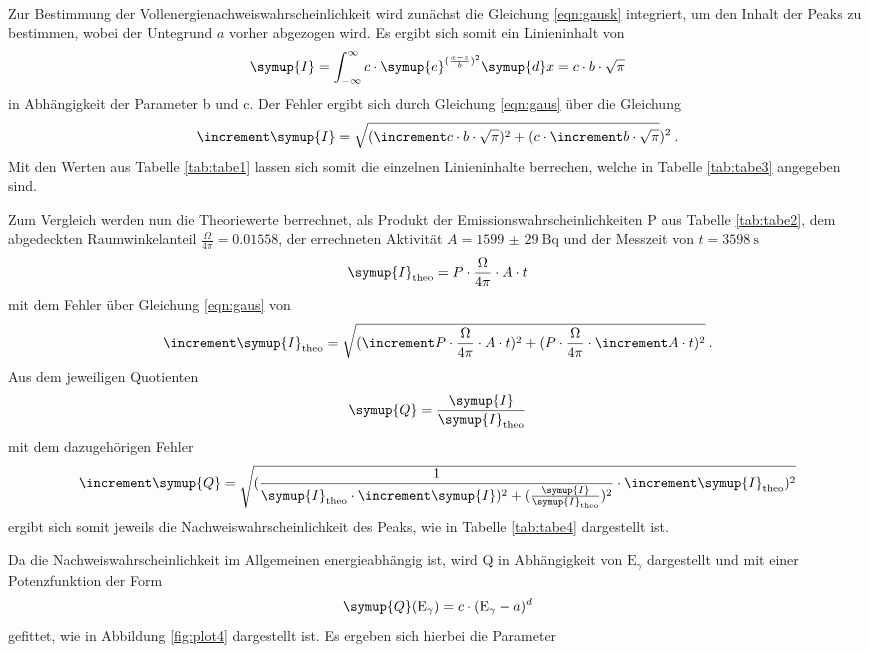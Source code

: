 \\
Zur Bestimmung der Vollenergienachweiswahrscheinlichkeit wird zunächst die Gleichung \ref{eqn:gausk}
integriert, um den Inhalt der Peaks zu bestimmen, wobei der Untegrund $a$ vorher abgezogen wird.
Es ergibt sich somit ein Linieninhalt von
\begin{equation}
  \symup{I} =\int_{-\infty}^{\infty} c \cdot \symup{e}^{(\frac{x-z}{b})^2} \symup{d}x
  = c \cdot b \cdot \sqrt{\pi}
  \label{eqn:inh}
\end{equation}
in Abhängigkeit der Parameter b und c.
Der Fehler ergibt sich durch Gleichung \ref{eqn:gaus} über die Gleichung
\begin{equation}
  \increment \symup{I} = \sqrt{ (\increment c \cdot b \cdot \sqrt{\pi})^{2}
   + (c \cdot \increment b \cdot \sqrt{\pi}})^{2} \: .
     \label{eqn:inhf}
\end{equation}
Mit den Werten aus Tabelle \ref{tab:tabe1} lassen sich somit die einzelnen Linieninhalte berrechen,
welche in Tabelle \ref{tab:tabe3} angegeben sind.

Zum Vergleich werden nun die Theoriewerte berrechnet, als Produkt
der Emissionswahrscheinlichkeiten P aus Tabelle \ref{tab:tabe2},
dem abgedeckten Raumwinkelanteil $\frac{\Omega}{4\pi}= 0.01558$, der errechneten Aktivität
$A =\SI{1599(29)}{\becquerel} $
und der Messzeit von $t = \SI{3598}{\second}$
\begin{equation}
  \symup{I}_{\text{theo}} = P\cdot \frac{\Omega}{4\pi} \cdot A \cdot t
\end{equation}
mit dem Fehler über Gleichung \ref{eqn:gaus} von
\begin{equation}
  \increment \symup{I}_{\text{theo}} = \sqrt{ (\increment P\cdot \frac{\Omega}{4\pi} \cdot A \cdot t)^{2}
   + (P\cdot \frac{\Omega}{4\pi} \cdot \increment A \cdot t)^{2}} \: .
\end{equation}
Aus dem jeweiligen Quotienten
\begin{equation}
  \symup{Q} = \frac{\symup{I}}{\symup{I}_{\text{theo}}}
\end{equation}
mit dem dazugehörigen Fehler
\begin{equation}
  \increment \symup{Q} = \sqrt{ (\frac{1}{\symup{I}_{\text{theo}} \cdot \increment \symup{I})^{2}
   + (\frac{\symup{I}}{\symup{I}_{\text{theo}}})^{2}}\cdot \increment \symup{I}_{\text{theo}})^{2}}
\end{equation}
ergibt sich somit jeweils die Nachweiswahrscheinlichkeit des Peaks, wie in Tabelle
\ref{tab:tabe4} dargestellt ist.

Da die Nachweiswahrscheinlichkeit im Allgemeinen energieabhängig ist, wird Q in
Abhängigkeit von $ \text{E}_{\gamma} $ dargestellt und mit einer Potenzfunktion der Form
\begin{equation}
  \symup{Q}(\text{E}_{\gamma}) = c\cdot (\text{E}_{\gamma}-a)^{d}
\end{equation}
gefittet, wie in Abbildung \ref{fig:plot4} dargestellt ist.
Es ergeben sich hierbei die Parameter

